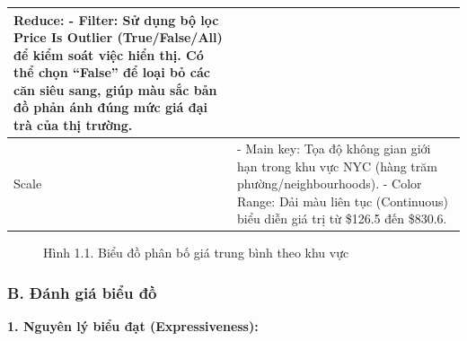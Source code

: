 \begin{longtable}{|p{2.8cm}|p{11.5cm}|}
\newline
\textbf{Reduce:} \newline
\newline
- Filter: Sử dụng bộ lọc Price Is Outlier (True/False/All) để kiểm soát việc hiển thị. Có thể chọn ``False'' để loại bỏ các căn siêu sang, giúp màu sắc bản đồ phản ánh đúng mức giá đại trà của thị trường. \\
\hline
Scale & - Main key: Tọa độ không gian giới hạn trong khu vực NYC (hàng trăm phường/neighbourhoods). \newline
\newline
- Color Range: Dải màu liên tục (Continuous) biểu diễn giá trị từ \$126.5 đến \$830.6. \\
\hline
\end{longtable}

\begin{figure}[H]
    \centering
    \caption{Hình 1.1. Biểu đồ phân bố giá trung bình theo khu vực}
    \label{fig:domain-task1-chart1}
\end{figure}

\subsubsection*{B. Đánh giá biểu đồ}

\textbf{1. Nguyên lý biểu đạt (Expressiveness):}

